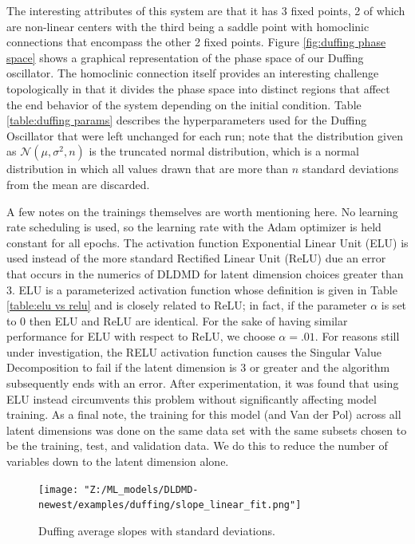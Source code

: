 The interesting attributes of this system are that it has 3 fixed points, 2 of which are non-linear 
centers with the third being a saddle point with homoclinic connections that encompass the other 2 fixed 
points. Figure \ref{fig:duffing phase space} shows a graphical representation of the phase space of our 
Duffing oscillator. The homoclinic connection itself provides an interesting challenge topologically in 
that it divides the phase space into distinct regions that affect the end behavior of the system depending
on the initial condition. Table \ref{table:duffing params} describes the hyperparameters used for the 
Duffing Oscillator that were left unchanged for each run; note that the distribution given as 
$\mathcal{N}(\mu, \sigma^2, n)$ is the truncated normal distribution, which is a normal distribution
in which all values drawn that are more than $n$ standard deviations from the mean are discarded. 

A few notes on the trainings themselves are worth mentioning here. No learning rate scheduling is used,
so the learning rate with the Adam optimizer is held constant for all epochs. The activation function
Exponential Linear Unit (ELU) is used instead of the more standard Rectified Linear Unit (ReLU) due an 
error that occurs in the numerics of DLDMD for latent dimension choices greater than 3. ELU is a 
parameterized activation function whose definition is given in Table \ref{table:elu vs relu} and is closely
related to ReLU; in fact, if the parameter $\alpha$ is set to 0 then ELU and ReLU are identical. For the
sake of having similar performance for ELU with respect to ReLU, we choose $\alpha = .01$. For reasons still 
under investigation, the RELU activation function causes the Singular Value Decomposition to fail if the 
latent dimension is 3 or greater and the algorithm subsequently ends with an error. After experimentation, 
it was found that using ELU instead circumvents this problem without significantly affecting model training.
As a final note, the training for this model (and Van der Pol) across all latent dimensions was done on the 
same data set with the same subsets chosen to be the training, test, and validation data. We do this to
reduce the number of variables down to the latent dimension alone.
\begin{figure}[!ht]
    \centering
    \begin{minipage}{\textwidth}
        \texttt{[image: "Z:/ML\_models/DLDMD-newest/examples/duffing/slope\_linear\_fit.png"]} 
    \end{minipage}%
    \caption{Duffing average slopes with standard deviations.}
    \label{fig:duffing average slopes}
\end{figure}

